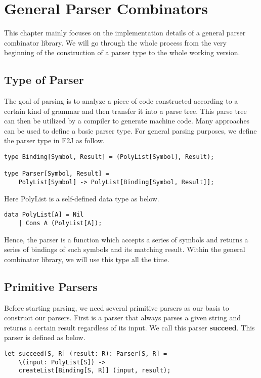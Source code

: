 \chapter{General Parser Combinators}
This chapter mainly focuses on the implementation details of a general parser combinator library. We will go through the whole process from the very beginning of the construction of a parser type to the whole working version.

\section{Type of Parser}
The goal of parsing is to analyze a piece of code constructed according to a certain kind of grammar and then transfer it into a parse tree. This parse tree can then be utilized by a compiler to generate machine code. Many approaches can be used to define a basic parser type. For general parsing purposes, we define the parser type in F2J as follow.

\begin{lstlisting}
type Binding[Symbol, Result] = (PolyList[Symbol], Result);

type Parser[Symbol, Result] =
	PolyList[Symbol] -> PolyList[Binding[Symbol, Result]];
\end{lstlisting}

Here PolyList is a self-defined data type as below.

\begin{lstlisting}
data PolyList[A] = Nil
	| Cons A (PolyList[A]);
\end{lstlisting}

Hence, the parser is a function which accepts a series of symbols and returns a series of bindings of such symbols and its matching result. Within the general combinator library, we will use this type all the time.

\section{Primitive Parsers}
Before starting parsing, we need several primitive parsers as our basis to construct our parsers. First is a parser that always parses a given string and returns a certain result regardless of its input. We call this parser \textbf{succeed}. This parser is defined as below.

\begin{lstlisting}
let succeed[S, R] (result: R): Parser[S, R] =
	\(input: PolyList[S]) ->
	createList[Binding[S, R]] (input, result);
\end{lstlisting}

